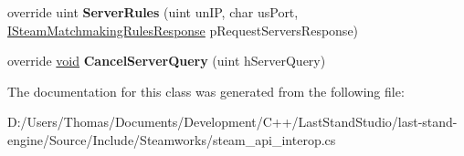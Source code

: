 \begin{DoxyCompactItemize}
\item 
\hypertarget{classValve_1_1Steamworks_1_1CSteamMatchmakingServers_a7483530f8a40b819cabb8d2c89eb18b0}{}override uint {\bfseries Server\+Rules} (uint un\+I\+P, char us\+Port, \hyperlink{classValve_1_1Steamworks_1_1ISteamMatchmakingRulesResponse}{I\+Steam\+Matchmaking\+Rules\+Response} p\+Request\+Servers\+Response)\label{classValve_1_1Steamworks_1_1CSteamMatchmakingServers_a7483530f8a40b819cabb8d2c89eb18b0}

\item 
\hypertarget{classValve_1_1Steamworks_1_1CSteamMatchmakingServers_abb2b8b1ba47e65a815fa3689fc3ac116}{}override \hyperlink{SDL__audio_8h_a52835ae37c4bb905b903cbaf5d04b05f}{void} {\bfseries Cancel\+Server\+Query} (uint h\+Server\+Query)\label{classValve_1_1Steamworks_1_1CSteamMatchmakingServers_abb2b8b1ba47e65a815fa3689fc3ac116}

\end{DoxyCompactItemize}


The documentation for this class was generated from the following file\+:\begin{DoxyCompactItemize}
\item 
D\+:/\+Users/\+Thomas/\+Documents/\+Development/\+C++/\+Last\+Stand\+Studio/last-\/stand-\/engine/\+Source/\+Include/\+Steamworks/steam\+\_\+api\+\_\+interop.\+cs\end{DoxyCompactItemize}
